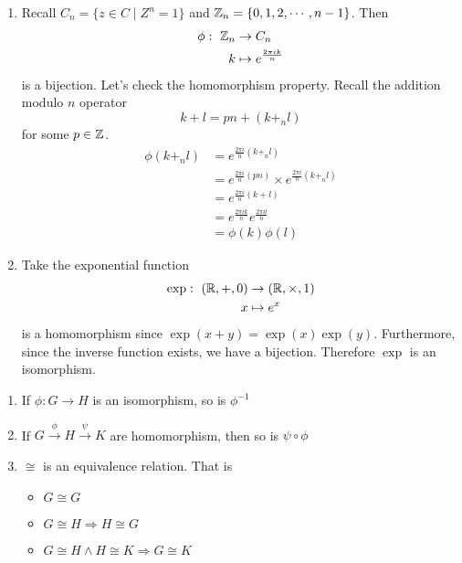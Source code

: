 \documentclass{article}
\begin{document}
\begin{eg}\leavevmode
    \begin{enumerate}
        \item Recall $C_n = \{z \in C \mid Z^n = 1\}$ and $\mathbb{Z}_n = \{0, 1, 2, \cdots, n-1\}$. Then
        \begin{align*}
            \phi : \ \mathbb{Z}_n &\rightarrow C_n \\
            k &\mapsto e^\frac{2 \pi i k}{n}
        \end{align*}
        is a bijection. Let's check the homomorphism property. Recall the addition modulo $n$ operator
        \[
            k + l = pn + (k +_n l)  
        \]
        for some $p \in \mathbb{Z}$.
        \begin{align*}
            \phi(k +_n l) &= e^{\frac{2 \pi i}{n}(k +_n l)} \\
            &= e^{\frac{2 \pi i}{n}(pn)} \times e^{\frac{2 \pi i}{n}(k +_n l)} \\
            &= e^{\frac{2 \pi i}{n}(k + l)} \\
            &= e^{\frac{2 \pi i k}{n}} e^{\frac{2 \pi i l}{n}} \\
            &= \phi(k)\phi(l)
        \end{align*}
        
        \item Take the exponential function
        \begin{align*}
            \exp : \ (\mathbb{R}, +, 0) &\rightarrow (\mathbb{R}, \times, 1)\\
            x &\mapsto e^x
        \end{align*}
        is a homomorphism since $\exp(x + y) = \exp(x)\exp(y)$. Furthermore, since the inverse function exists, we have a bijection. Therefore $\exp$ is an isomorphism.
    \end{enumerate}
\end{eg}

\begin{lemma}\leavevmode
    \begin{enumerate}
        \item If $\phi : G \rightarrow H$ is an isomorphism, so is $\phi^{-1}$
        \item If $G \xrightarrow{\phi} H \xrightarrow{\psi} K$ are homomorphism, then so is $\psi \circ \phi$
        \item $\cong$ is an equivalence relation. That is
        \begin{itemize}
            \item $G \cong G$
            \item $G \cong H \Rightarrow H \cong G$
            \item $G \cong H \wedge H \cong K \Rightarrow G \cong K$
        \end{itemize}
    \end{enumerate}
\end{lemma}
\end{document}
